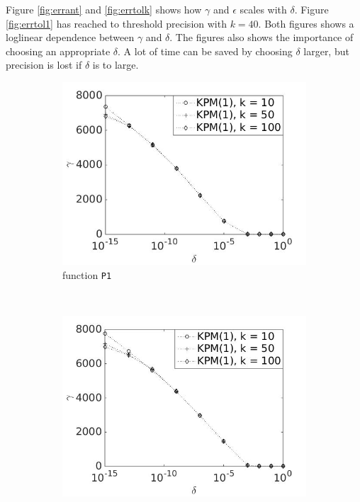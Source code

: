 Figure \ref{fig:errant} and \ref{fig:errtolk} shows how $\gamma$ and $\epsilon$ scales with $\delta$. Figure \ref{fig:errtol1} has reached to threshold precision with $k = 40$. Both figures shows a loglinear dependence between $\gamma$ and $\delta$. The figures also shows the importance of choosing an appropriate $\delta$. A lot of time can be saved by choosing $\delta$ larger, but precision is lost if $\delta$ is to large.
\begin{figure}[H]
        \centering
        \begin{subfigure}[b]{0.45\textwidth}
                \includegraphics[width=\textwidth]{fig/s20antvstol1k}
                \caption{function \texttt{P1}}
                \label{fig:anttol1k}
        \end{subfigure}
~
        \begin{subfigure}[b]{0.45\textwidth}
                \includegraphics[width=\textwidth]{fig/s21antvstol2k}

\end{subfigure}
\end{figure}
